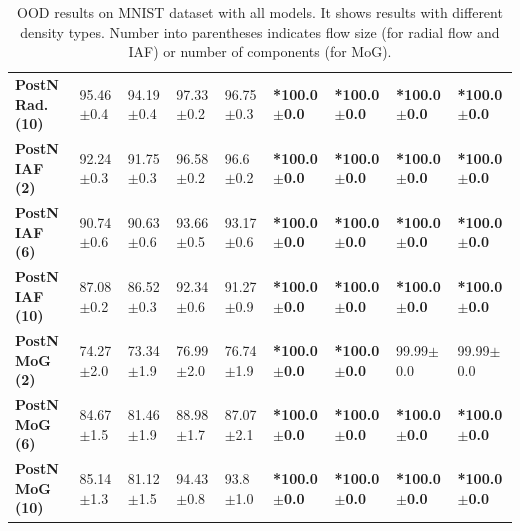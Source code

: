 \begin{table}[ht]
{\begin{tabular}{lllllllll}
\textbf{PostN Rad. (10)} &         95.46$\pm$0.4 &          94.19$\pm$0.4 &         97.33$\pm$0.2 &          96.75$\pm$0.3 &           \textbf{*100.0$\pm$0.0} &            \textbf{*100.0$\pm$0.0} &           \textbf{*100.0$\pm$0.0} &            \textbf{*100.0$\pm$0.0} \\
\textbf{PostN IAF (2)  } &         92.24$\pm$0.3 &          91.75$\pm$0.3 &         96.58$\pm$0.2 &           96.6$\pm$0.2 &           \textbf{*100.0$\pm$0.0} &            \textbf{*100.0$\pm$0.0} &           \textbf{*100.0$\pm$0.0} &            \textbf{*100.0$\pm$0.0} \\
\textbf{PostN IAF (6)  } &         90.74$\pm$0.6 &          90.63$\pm$0.6 &         93.66$\pm$0.5 &          93.17$\pm$0.6 &           \textbf{*100.0$\pm$0.0} &            \textbf{*100.0$\pm$0.0} &           \textbf{*100.0$\pm$0.0} &            \textbf{*100.0$\pm$0.0} \\
\textbf{PostN IAF (10) } &         87.08$\pm$0.2 &          86.52$\pm$0.3 &         92.34$\pm$0.6 &          91.27$\pm$0.9 &           \textbf{*100.0$\pm$0.0} &            \textbf{*100.0$\pm$0.0} &           \textbf{*100.0$\pm$0.0} &            \textbf{*100.0$\pm$0.0} \\
\textbf{PostN MoG (2)  } &         74.27$\pm$2.0 &          73.34$\pm$1.9 &         76.99$\pm$2.0 &          76.74$\pm$1.9 &           \textbf{*100.0$\pm$0.0} &            \textbf{*100.0$\pm$0.0} &           99.99$\pm$0.0 &            99.99$\pm$0.0 \\
\textbf{PostN MoG (6)  } &         84.67$\pm$1.5 &          81.46$\pm$1.9 &         88.98$\pm$1.7 &          87.07$\pm$2.1 &           \textbf{*100.0$\pm$0.0} &            \textbf{*100.0$\pm$0.0} &           \textbf{*100.0$\pm$0.0} &            \textbf{*100.0$\pm$0.0} \\
\textbf{PostN MoG (10) } &         85.14$\pm$1.3 &          81.12$\pm$1.5 &         94.43$\pm$0.8 &           93.8$\pm$1.0 &           \textbf{*100.0$\pm$0.0} &            \textbf{*100.0$\pm$0.0} &           \textbf{*100.0$\pm$0.0} &            \textbf{*100.0$\pm$0.0} \\
\bottomrule
\end{tabular}

    }
    \caption{OOD results on MNIST dataset with all models. It shows results with different density types. Number into parentheses indicates flow size (for radial flow and IAF) or number of components (for MoG).}
    \label{fig:ood_MNIST_full}
\end{table}

